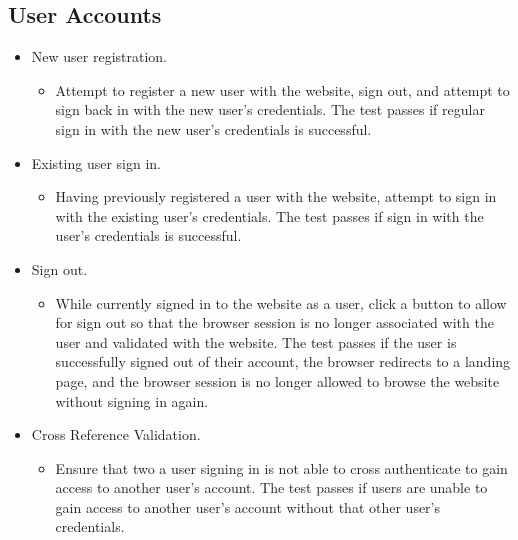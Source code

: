 \subsection{User Accounts}
\begin{itemize}
    \item New user registration.
    \begin{itemize}
        \item Attempt to register a new user with the website, sign out, and attempt to sign back in with the new user's credentials.  The test passes if regular sign in with the new user's credentials is successful.
    \end{itemize}

    \item Existing user sign in.
    \begin{itemize}
        \item Having previously registered a user with the website, attempt to sign in with the existing user's credentials. The test passes if sign in with the user's credentials is successful.
    \end{itemize}

    \item Sign out.
    \begin{itemize}
        \item While currently signed in to the website as a user, click a button to allow for sign out so that the browser session is no longer associated with the user and validated with the website.  The test passes if the user is successfully signed out of their account, the browser redirects to a landing page, and the browser session is no longer allowed to browse the website without signing in again.
    \end{itemize}

    \item Cross Reference Validation.
    \begin{itemize}
        \item Ensure that two a user signing in is not able to cross authenticate to gain access to another user's account.  The test passes if users are unable to gain access to another user's account without that other user's credentials.
    \end{itemize}
\end{itemize}


